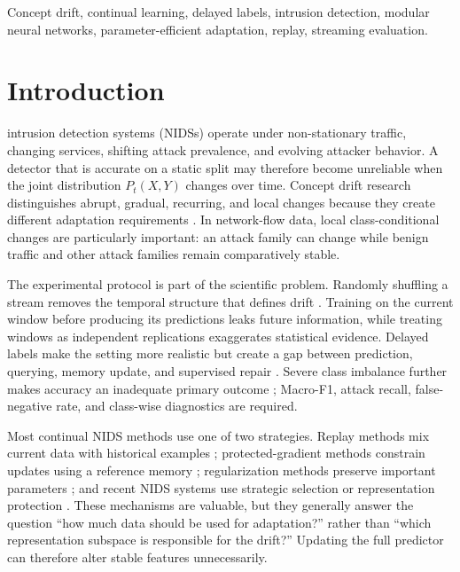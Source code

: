 \documentclass{ieeeaccess}
\begin{document}
\begin{keywords}
Concept drift, continual learning, delayed labels, intrusion detection, modular neural networks, parameter-efficient adaptation, replay, streaming evaluation.
\end{keywords}

\titlepgskip=-15pt
\maketitle

\section{Introduction}
\label{sec:introduction}

 intrusion detection systems (NIDSs) operate under non-stationary traffic, changing services, shifting attack prevalence, and evolving attacker behavior. A detector that is accurate on a static split may therefore become unreliable when the joint distribution $P_t(X,Y)$ changes over time. Concept drift research distinguishes abrupt, gradual, recurring, and local changes because they create different adaptation requirements \cite{Arora2024DriftReview,Li2024DriftType,Aguiar2024Locality}. In network-flow data, local class-conditional changes are particularly important: an attack family can change while benign traffic and other attack families remain comparatively stable.

The experimental protocol is part of the scientific problem. Randomly shuffling a stream removes the temporal structure that defines drift \cite{Lukats2025DriftBenchmark}. Training on the current window before producing its predictions leaks future information, while treating windows as independent replications exaggerates statistical evidence. Delayed labels make the setting more realistic but create a gap between prediction, querying, memory update, and supervised repair \cite{Csaba2024LabelDelay}. Severe class imbalance further makes accuracy an inadequate primary outcome \cite{Palli2024DriftImbalance,Chen2024ImbalancedSurvey}; Macro-F1, attack recall, false-negative rate, and class-wise diagnostics are required.

Most continual NIDS methods use one of two strategies. Replay methods mix current data with historical examples \cite{Wang2024ContinualSurvey,Amalapuram2023NIDSReplay}; protected-gradient methods constrain updates using a reference memory \cite{Chaudhry2019AGEM}; regularization methods preserve important parameters \cite{Kirkpatrick2017EWC,Wang2024ContinualSurvey}; and recent NIDS systems use strategic selection or representation protection \cite{Zhang2025SSF,Liu2026RepShield}. These mechanisms are valuable, but they generally answer the question ``how much data should be used for adaptation?'' rather than ``which representation subspace is responsible for the drift?'' Updating the full predictor can therefore alter stable features unnecessarily.
\end{document}
